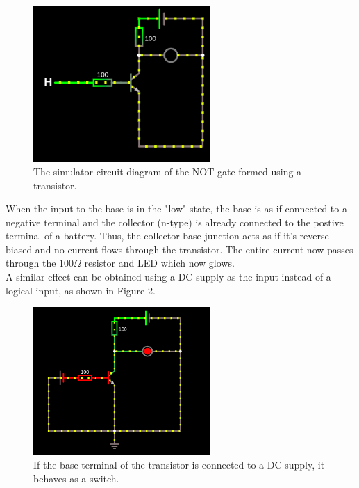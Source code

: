\documentclass{article}
\begin{document}
	\begin{figure}[H]
	\begin{center}
		\includegraphics[width=0.6\textwidth]{NOT_gate.png}
		\caption{The simulator circuit diagram of the NOT gate formed using a transistor.}
	\end{center}
\end{figure}

	When the input to the base is in the "low" state, the base is as if connected to a negative terminal and the collector (n-type) is already connected to the postive terminal of a battery. Thus, the collector-base junction acts as if it's reverse biased and no current flows through the transistor. The entire current now passes through the $100\Omega$ resistor and LED which now glows.\\
	
	A similar effect can be obtained using a DC supply as the input instead of a logical input, as shown in Figure 2.

\begin{figure}[H]
	\begin{center}
		\includegraphics[width=0.6\textwidth]{DC_input.png}
		\caption{If the base terminal of the transistor is connected to a DC supply, it behaves as a switch.}
	\end{center}
\end{figure}
\end{document}
